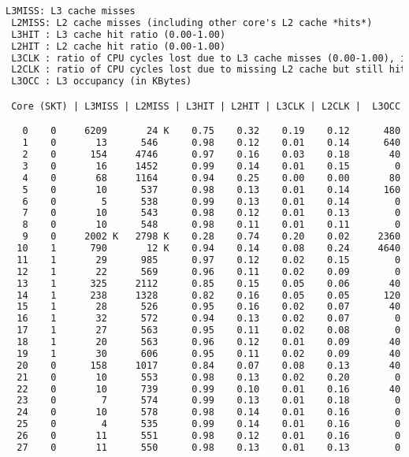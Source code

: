 \begin{lstlisting}[language=TeX]
 L3MISS: L3 cache misses
 L2MISS: L2 cache misses (including other core's L2 cache *hits*)
 L3HIT : L3 cache hit ratio (0.00-1.00)
 L2HIT : L2 cache hit ratio (0.00-1.00)
 L3CLK : ratio of CPU cycles lost due to L3 cache misses (0.00-1.00), in some cases could be >1.0 due to a higher memory latency
 L2CLK : ratio of CPU cycles lost due to missing L2 cache but still hitting  L3 cache (0.00-1.00)
 L3OCC : L3 occupancy (in KBytes)

 Core (SKT) | L3MISS | L2MISS | L3HIT | L2HIT | L3CLK | L2CLK |  L3OCC

   0    0     6209       24 K    0.75    0.32    0.19    0.12      480
   1    0       13      546      0.98    0.12    0.01    0.14      640
   2    0      154     4746      0.97    0.16    0.03    0.18       40
   3    0       16     1452      0.99    0.14    0.01    0.15        0
   4    0       68     1164      0.94    0.25    0.00    0.00       80
   5    0       10      537      0.98    0.13    0.01    0.14      160
   6    0        5      538      0.99    0.13    0.01    0.14        0
   7    0       10      543      0.98    0.12    0.01    0.13        0
   8    0       10      548      0.98    0.11    0.01    0.11        0
   9    0     2002 K   2798 K    0.28    0.74    0.20    0.02     2360
  10    1      790       12 K    0.94    0.14    0.08    0.24     4640
  11    1       29      985      0.97    0.12    0.02    0.15        0
  12    1       22      569      0.96    0.11    0.02    0.09        0
  13    1      325     2112      0.85    0.15    0.05    0.06       40
  14    1      238     1328      0.82    0.16    0.05    0.05      120
  15    1       28      526      0.95    0.16    0.02    0.07       40
  16    1       32      572      0.94    0.13    0.02    0.07        0
  17    1       27      563      0.95    0.11    0.02    0.08        0
  18    1       20      563      0.96    0.12    0.01    0.09       40
  19    1       30      606      0.95    0.11    0.02    0.09       40
  20    0      158     1017      0.84    0.07    0.08    0.13       40
  21    0       10      553      0.98    0.13    0.02    0.20        0
  22    0       10      739      0.99    0.10    0.01    0.16       40
  23    0        7      574      0.99    0.13    0.01    0.18        0
  24    0       10      578      0.98    0.14    0.01    0.16        0
  25    0        4      535      0.99    0.14    0.01    0.16        0
  26    0       11      551      0.98    0.12    0.01    0.16        0
  27    0       11      550      0.98    0.13    0.01    0.13        0

\end{lstlisting}
